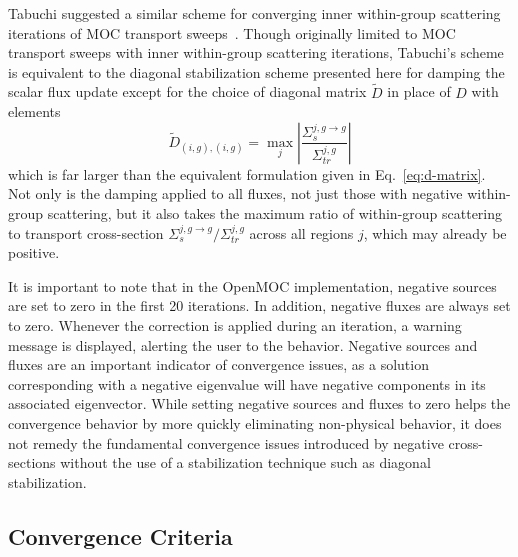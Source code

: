 Tabuchi suggested a similar scheme for converging inner within-group scattering iterations of \ac{MOC} transport sweeps~\cite{ty-solution}. Though originally limited to \ac{MOC} transport sweeps with inner within-group scattering iterations, Tabuchi's scheme is equivalent to the diagonal stabilization scheme presented here for damping the scalar flux update except for the choice of diagonal matrix $\tilde{D}$ in place of $D$ with elements
\begin{equation}
\tilde{D}_{(i,g), (i,g)} = \max_j \left|\frac{\Sigma_{s}^{j, g \rightarrow g}}{\Sigma_{\textit{tr}}^{j, g}} \right|
\end{equation}
which is far larger than the equivalent formulation given in Eq.~\ref{eq:d-matrix}. Not only is the damping applied to all fluxes, not just those with negative within-group scattering, but it also takes the maximum ratio of within-group scattering to transport cross-section $\Sigma_{s}^{j,g \rightarrow g} / \Sigma_{\textit{tr}}^{j, g}$ across all regions $j$, which may already be positive.

It is important to note that in the OpenMOC implementation, negative sources are set to zero in the first 20 iterations. In addition, negative fluxes are always set to zero. Whenever the correction is applied during an iteration, a warning message is displayed, alerting the user to the behavior. Negative sources and fluxes are an important indicator of convergence issues, as a solution corresponding with a negative eigenvalue will have negative components in its associated eigenvector. While setting negative sources and fluxes to zero helps the convergence behavior by more quickly eliminating non-physical behavior, it does not remedy the fundamental convergence issues introduced by negative cross-sections without the use of a stabilization technique such as diagonal stabilization.


\subsection{Convergence Criteria}
\label{sec:conv-criteria}

